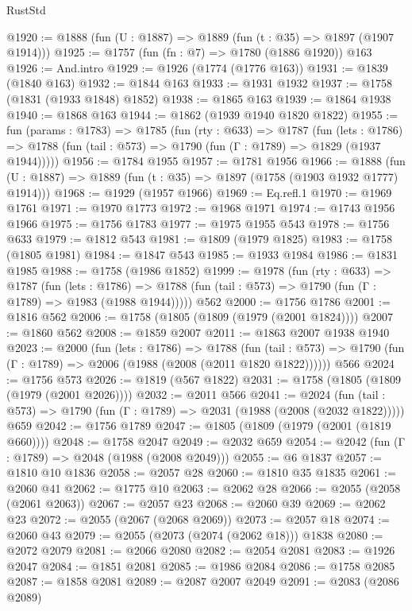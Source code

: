 \begin{lexlean}{RustStd}
\begin{coremodule}
{\begin{coremodule}
{{{{{{{{{{{{{{{@1920 := @1888 (fun (U : @1887) => @1889 (fun (t : @35) => @1897 (@1907 @1914)))
@1925 := @1757 (fun (fn : @7) => @1780 (@1886 @1920)) @163
@1926 := And.intro
@1929 := @1926 (@1774 (@1776 @163))
@1931 := @1839 (@1840 @163)
@1932 := @1844 @163
@1933 := @1931 @1932
@1937 := @1758 (@1831 (@1933 @1848) @1852)
@1938 := @1865 @163
@1939 := @1864 @1938
@1940 := @1868 @163
@1944 := @1862 (@1939 @1940 @1820 @1822)
@1955 := fun (params : @1783) =>
  @1785
    (fun (rty : @633) =>
    @1787
      (fun (lets : @1786) =>
      @1788 (fun (tail : @573) => @1790 (fun (Γ : @1789) => @1829 (@1937 @1944)))))
@1956 := @1784 @1955
@1957 := @1781 @1956
@1966 := @1888 (fun (U : @1887) => @1889 (fun (t : @35) => @1897 (@1758 (@1903 @1932 @1777) @1914)))
@1968 := @1929 (@1957 @1966)
@1969 := Eq.refl.{1}
@1970 := @1969 @1761
@1971 := @1970 @1773
@1972 := @1968 @1971
@1974 := @1743 @1956 @1966
@1975 := @1756 @1783
@1977 := @1975 @1955 @543
@1978 := @1756 @633
@1979 := @1812 @543
@1981 := @1809 (@1979 @1825)
@1983 := @1758 (@1805 @1981)
@1984 := @1847 @543
@1985 := @1933 @1984
@1986 := @1831 @1985
@1988 := @1758 (@1986 @1852)
@1999 := @1978
    (fun (rty : @633) =>
    @1787
      (fun (lets : @1786) =>
      @1788 (fun (tail : @573) => @1790 (fun (Γ : @1789) => @1983 (@1988 @1944)))))
    @562
@2000 := @1756 @1786
@2001 := @1816 @562
@2006 := @1758 (@1805 (@1809 (@1979 (@2001 @1824))))
@2007 := @1860 @562
@2008 := @1859 @2007
@2011 := @1863 @2007 @1938 @1940
@2023 := @2000
    (fun (lets : @1786) =>
    @1788
      (fun (tail : @573) => @1790 (fun (Γ : @1789) => @2006 (@1988 (@2008 (@2011 @1820 @1822))))))
    @566
@2024 := @1756 @573
@2026 := @1819 (@567 @1822)
@2031 := @1758 (@1805 (@1809 (@1979 (@2001 @2026))))
@2032 := @2011 @566
@2041 := @2024
    (fun (tail : @573) => @1790 (fun (Γ : @1789) => @2031 (@1988 (@2008 (@2032 @1822)))))
    @659
@2042 := @1756 @1789
@2047 := @1805 (@1809 (@1979 (@2001 (@1819 @660))))
@2048 := @1758 @2047
@2049 := @2032 @659
@2054 := @2042 (fun (Γ : @1789) => @2048 (@1988 (@2008 @2049)))
@2055 := @6 @1837
@2057 := @1810 @10 @1836
@2058 := @2057 @28
@2060 := @1810 @35 @1835
@2061 := @2060 @41
@2062 := @1775 @10
@2063 := @2062 @28
@2066 := @2055 (@2058 (@2061 @2063))
@2067 := @2057 @23
@2068 := @2060 @39
@2069 := @2062 @23
@2072 := @2055 (@2067 (@2068 @2069))
@2073 := @2057 @18
@2074 := @2060 @43
@2079 := @2055 (@2073 (@2074 (@2062 @18))) @1838
@2080 := @2072 @2079
@2081 := @2066 @2080
@2082 := @2054 @2081
@2083 := @1926 @2047
@2084 := @1851 @2081
@2085 := @1986 @2084
@2086 := @1758 @2085
@2087 := @1858 @2081
@2089 := @2087 @2007 @2049
@2091 := @2083 (@2086 @2089)
}}}}}}}}}}}}}}}
\end{coremodule}}
\end{coremodule}
\end{lexlean}
